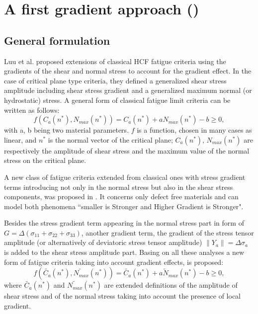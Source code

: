 \section{A first gradient approach (\cite{luu2014formulation})}
\subsection{General formulation}

Luu et al. \cite{luu2014formulation} proposed extensions of classical HCF fatigue criteria using the gradients of the shear and normal stress to account for the gradient effect. In the case of critical plane type criteria, they defined a generalized shear stress amplitude including shear stress gradient and a generalized maximum normal (or hydrostatic) stress.
A general form of classical fatigue limit criteria can be written as follows:
\begin{equation}
	\label{eq:classical}
	f(C_a(n^*),N_{max}(n^*))=C_a(n^*)+aN_{max}(n^*)-b\geqslant 0 ,
\end{equation}
with a, b being two material parameters. $f$ is a function, chosen in many cases as linear, and $n^*$ is the normal vector of the critical plane; $C_a(n^* )$, $N_{max} (n^* )$ are respectively the amplitude of shear stress and the maximum value of the normal stress on the critical plane.

A new class of fatigue criteria extended from classical ones with stress gradient terms introducing not only in the normal stress but also in the shear stress components, was proposed in \cite{luu2014formulation}. It concerns only defect free materials and can model both phenomena ``smaller is Stronger and Higher Gradient is Stronger". 

Besides the stress gradient term appearing in the normal stress part in form of $G=\Delta(\sigma_{11}+\sigma_{22}+\sigma_{33})$, another gradient term, the gradient of the stress tensor amplitude (or alternatively of deviatoric stress tensor amplitude) $\parallel{Y}_a\parallel={\Delta\sigma}_a$ is added to the shear stress amplitude part. Basing on all these analyses a new form of fatigue criteria taking into account gradient effects, is proposed:
\begin{equation}
	f(\widetilde{C_a}(n^*),\widetilde{N_{max}}(n^*))=\widetilde{C_a}(n^*)+a\widetilde{N}_{max}(n^*)-b\geqslant 0 ,
	\label{eq:gradient crossland}
\end{equation}
where $\widetilde{C_a}(n^*)$ and $\widetilde{N_{max}}(n^*)$ are extended definitions of the amplitude of shear stress and of the normal stress taking into account the presence of local gradient.

